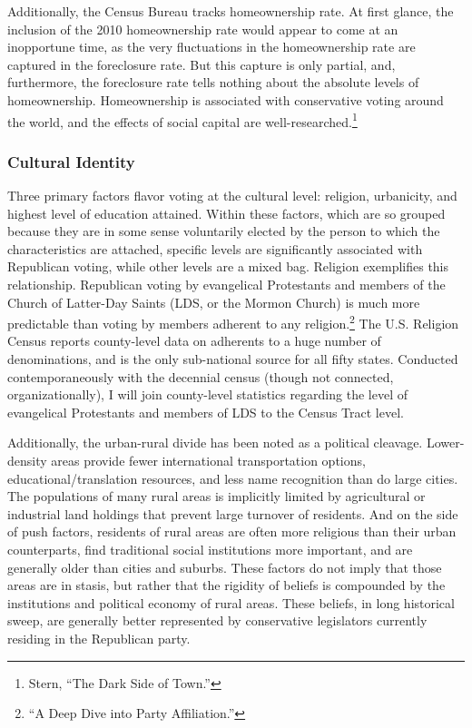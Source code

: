 \documentclass[
]{article}
\begin{document}
Additionally, the Census Bureau tracks homeownership rate.
At first glance, the inclusion of the 2010 homeownership rate would appear to come at an inopportune time, as the very fluctuations in the homeownership rate are captured in the foreclosure rate.
But this capture is only partial, and, furthermore, the foreclosure rate tells nothing about the absolute levels of homeownership.
Homeownership is associated with conservative voting around the world, and the effects of social capital are well-researched.\footnote{Stern, ``The Dark Side of Town.''}

\hypertarget{cultural-identity}{%
\subsubsection{Cultural Identity}\label{cultural-identity}}

Three primary factors flavor voting at the cultural level: religion, urbanicity, and highest level of education attained.
Within these factors, which are so grouped because they are in some sense voluntarily elected by the person to which the characteristics are attached, specific levels are significantly associated with Republican voting, while other levels are a mixed bag.
Religion exemplifies this relationship.
Republican voting by evangelical Protestants and members of the Church of Latter-Day Saints (LDS, or the Mormon Church) is much more predictable than voting by members adherent to any religion.\footnote{``A Deep Dive into Party Affiliation.''}
The U.S. Religion Census reports county-level data on adherents to a huge number of denominations, and is the only sub-national source for all fifty states.
Conducted contemporaneously with the decennial census (though not connected, organizationally), I will join county-level statistics regarding the level of evangelical Protestants and members of LDS to the Census Tract level.

Additionally, the urban-rural divide has been noted as a political cleavage.
Lower-density areas provide fewer international transportation options, educational/translation resources, and less name recognition than do large cities.
The populations of many rural areas is implicitly limited by agricultural or industrial land holdings that prevent large turnover of residents.
And on the side of push factors, residents of rural areas are often more religious than their urban counterparts, find traditional social institutions more important, and are generally older than cities and suburbs.
These factors do not imply that those areas are in stasis, but rather that the rigidity of beliefs is compounded by the institutions and political economy of rural areas.
These beliefs, in long historical sweep, are generally better represented by conservative legislators currently residing in the Republican party.
\end{document}
